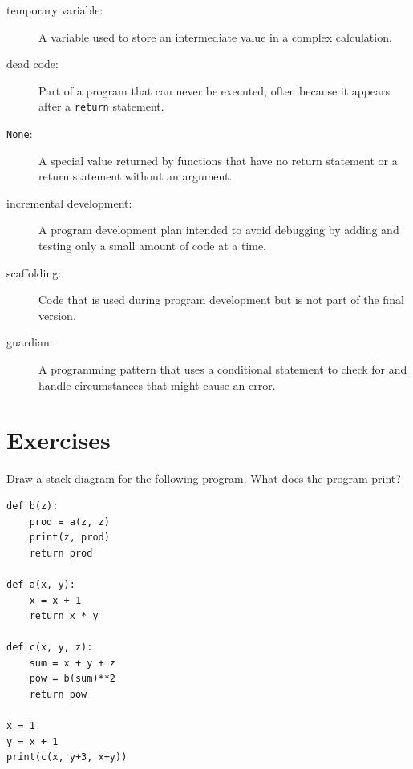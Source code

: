\documentclass[10pt]{book}
\begin{document}
\begin{description}

\item[temporary variable:]  A variable used to store an intermediate value in
a complex calculation.

\item[dead code:]  Part of a program that can never be executed, often because
it appears after a {\tt return} statement.

\item[{\tt None}:]  A special value returned by functions that
have no return statement or a return statement without an argument.

\item[incremental development:]  A program development plan intended to
avoid debugging by adding and testing only
a small amount of code at a time.

\item[scaffolding:]  Code that is used during program development but is
not part of the final version.

\item[guardian:]  A programming pattern that uses a conditional
statement to check for and handle circumstances that
might cause an error.

\end{description}


\section{Exercises}

\begin{ex}

Draw a stack diagram for the following
program.  What does the program print?

\beforeverb
\begin{verbatim}
def b(z):
    prod = a(z, z)
    print(z, prod)
    return prod

def a(x, y):
    x = x + 1
    return x * y

def c(x, y, z):
    sum = x + y + z
    pow = b(sum)**2
    return pow

x = 1
y = x + 1
print(c(x, y+3, x+y))
\end{verbatim}
\afterverb

\end{ex}
\end{document}
